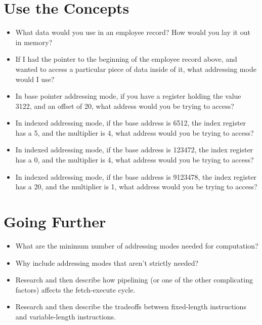 \section{Use the Concepts}

\begin{itemize}\item What data would you use in an employee record?  How would you lay it out in memory? 
\item If I had the pointer to the beginning of the employee record above, and wanted to access a particular piece of data inside of it, what addressing mode would I use? 
\item In base pointer addressing mode, if you have a register holding the value 3122, and an offset of 20, what address would you be trying to access? 
\item In indexed addressing mode, if the base address is 6512, the index register has a 5, and the multiplier is 4, what address would you be trying to access? 
\item In indexed addressing mode, if the base address is 123472, the index register has a 0, and the multiplier is 4, what address would you be trying to access? 
\item In indexed addressing mode, if the base address is 9123478, the index register has a 20, and the multiplier is 1, what address would you be trying to access? 
\end{itemize}

\section{Going Further}

\begin{itemize}\item What are the minimum number of addressing modes needed for computation? 
\item Why include addressing modes that aren't strictly needed? 
\item Research and then describe how pipelining (or one of the other complicating factors) affects the fetch-execute cycle. 
\item Research and then describe the tradeoffs between fixed-length instructions and variable-length instructions. 
\end{itemize}

